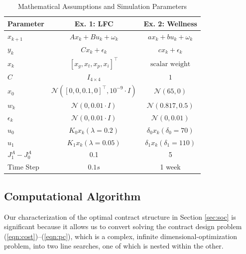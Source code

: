 \documentclass[letterpaper, 10 pt, conference]{ieeeconf}  %
\begin{document}
\begin{table}[t]
    \centering
    \caption{Mathematical Assumptions and Simulation Parameters}
    \label{tab:math_assumptions}
    \renewcommand{\arraystretch}{1.05} %
    \begin{tabular}{lcc}
        \hline
        \textbf{Parameter} & \textbf{Ex. 1: LFC} & \textbf{Ex. 2: Wellness} \\
        \hline
        $x_{k+1}$ & $Ax_k + Bu_k + \omega_k$ & $a x_k + b u_k + \omega_k$ \\
        $y_k$ & $Cx_k + \epsilon_k$ & $c x_k + \epsilon_k$ \\
        $x_k$ & $[x_g, x_t, x_p, x_i]^\top$ & $\text{scalar weight}$ \\
        $C$ & $I_{4 \times 4}$ & $1$ \\
        $x_0$ & $\mathcal{N}([0,0,0.1,0]^\top, 10^{-9}\cdot I)$ & $\mathcal{N}(65, 0)$\\%
        $w_k$ & $\mathcal{N}(0, 0.01\cdot I)$ & $\mathcal{N}(0.817, 0.5)$ \\
        $\epsilon_k$ & $\mathcal{N}(0, 0.01 \cdot I)$ & $\mathcal{N}(0, 0.01)$ \\
        $u_0$ & $K_0 x_k (\lambda = 0.2)$ & $\delta_0x_k(\delta_0 = 70)$ \\
        $u_1$ & $K_1 x_k (\lambda = 0.05)$ & $\delta_1x_k(\delta_1 = 110)$  \\
        $J^A_1 - J^A_0$ & 0.1 & 5\\
        Time Step & $0.1s$ & 1 week \\
        \hline
    \end{tabular}
\end{table}
\subsection{Computational Algorithm}

Our characterization of the optimal contract structure in Section \ref{sec:soc} is significant because  it allows us to convert solving the contract design problem (\ref{eqn:cost})--(\ref{eqn:pc}), which is a complex, infinite dimensional-optimization problem, into two line searches, one of which is nested within the other.
\end{document}
